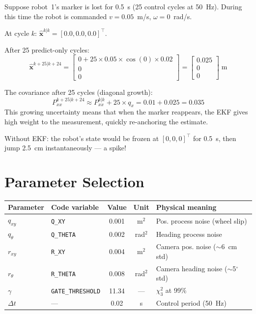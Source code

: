 \documentclass[12pt,a4paper]{article}
\begin{document}
Suppose robot~1's marker is lost for 0.5~s (25 control cycles at 50~Hz).
During this time the robot is commanded $v = 0.05$~m/s, $\omega = 0$~rad/s.

At cycle $k$: $\hat{\bm{x}}^{k|k} = [0.0, 0.0, 0.0]^\top$.

After 25 predict-only cycles:
\begin{equation}
  \hat{\bm{x}}^{k+25|k+24} =
  \begin{bmatrix} 0 + 25 \times 0.05 \times \cos(0) \times 0.02 \\ 0 \\ 0 \end{bmatrix}
  = \begin{bmatrix} 0.025 \\ 0 \\ 0 \end{bmatrix} \;\text{m}
\end{equation}

The covariance after 25 cycles (diagonal growth):
\begin{equation}
  P_{xx}^{k+25|k+24} \approx P_{xx}^{k|k} + 25 \times q_x = 0.01 + 0.025 = 0.035
\end{equation}
This growing uncertainty means that when the marker reappears, the EKF gives high
weight to the measurement, quickly re-anchoring the estimate.

Without EKF: the robot's state would be frozen at $[0,0,0]^\top$ for 0.5~s, then
jump 2.5~cm instantaneously --- a spike!

\section{Parameter Selection}
\label{sec:params}

\begin{center}
\begin{tabular}{@{}llccp{5.5cm}@{}}
\toprule
Parameter & Code variable & Value & Unit & Physical meaning \\
\midrule
$q_{xy}$ & \lstinline|Q_XY| & 0.001 & m$^2$ & Pos. process noise (wheel slip) \\
$q_\theta$ & \lstinline|Q_THETA| & 0.002 & rad$^2$ & Heading process noise \\
$r_{xy}$ & \lstinline|R_XY| & 0.004 & m$^2$ & Camera pos. noise ($\sim$6~cm std) \\
$r_\theta$ & \lstinline|R_THETA| & 0.008 & rad$^2$ & Camera heading noise ($\sim$5$^\circ$ std) \\
$\gamma$ & \lstinline|GATE_THRESHOLD| & 11.34 & --- & $\chi^2_3$ at 99\% \\
$\Delta t$ & --- & 0.02 & s & Control period (50~Hz) \\
\bottomrule
\end{tabular}
\end{center}
\end{document}
